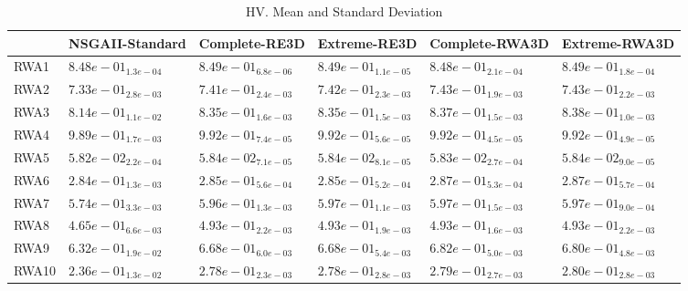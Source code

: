 \documentclass{article}
\begin{document}
\begin{table}
\caption{HV. Mean and Standard Deviation}
\label{table: HV}
\centering
\begin{scriptsize}
\begin{tabular}{llllll}
\hline & NSGAII-Standard & Complete-RE3D & Extreme-RE3D & Complete-RWA3D &  Extreme-RWA3D\\
\hline 
RWA1 & $  8.48e-01_{ 1.3e-04}$ & \cellcolor{gray95}$  8.49e-01_{ 6.8e-06}$ & \cellcolor{gray25}$  8.49e-01_{ 1.1e-05}$ & $  8.48e-01_{ 2.1e-04}$ & $  8.49e-01_{ 1.8e-04}$ \\
RWA2 & $  7.33e-01_{ 2.8e-03}$ & $  7.41e-01_{ 2.4e-03}$ & $  7.42e-01_{ 2.3e-03}$ & \cellcolor{gray95}$  7.43e-01_{ 1.9e-03}$ & \cellcolor{gray25}$  7.43e-01_{ 2.2e-03}$ \\
RWA3 & $  8.14e-01_{ 1.1e-02}$ & $  8.35e-01_{ 1.6e-03}$ & $  8.35e-01_{ 1.5e-03}$ & \cellcolor{gray25}$  8.37e-01_{ 1.5e-03}$ & \cellcolor{gray95}$  8.38e-01_{ 1.0e-03}$ \\
RWA4 & $  9.89e-01_{ 1.7e-03}$ & $  9.92e-01_{ 7.4e-05}$ & $  9.92e-01_{ 5.6e-05}$ & \cellcolor{gray25}$  9.92e-01_{ 4.5e-05}$ & \cellcolor{gray95}$  9.92e-01_{ 4.9e-05}$ \\
RWA5 & $  5.82e-02_{ 2.2e-04}$ & \cellcolor{gray25}$  5.84e-02_{ 7.1e-05}$ & $  5.84e-02_{ 8.1e-05}$ & $  5.83e-02_{ 2.7e-04}$ & \cellcolor{gray95}$  5.84e-02_{ 9.0e-05}$ \\
RWA6 & $  2.84e-01_{ 1.3e-03}$ & $  2.85e-01_{ 5.6e-04}$ & $  2.85e-01_{ 5.2e-04}$ & \cellcolor{gray95}$  2.87e-01_{ 5.3e-04}$ & \cellcolor{gray25}$  2.87e-01_{ 5.7e-04}$ \\
RWA7 & $  5.74e-01_{ 3.3e-03}$ & $  5.96e-01_{ 1.3e-03}$ & \cellcolor{gray95}$  5.97e-01_{ 1.1e-03}$ & \cellcolor{gray25}$  5.97e-01_{ 1.5e-03}$ & $  5.97e-01_{ 9.0e-04}$ \\
RWA8 & $  4.65e-01_{ 6.6e-03}$ & $  4.93e-01_{ 2.2e-03}$ & $  4.93e-01_{ 1.9e-03}$ & \cellcolor{gray95}$  4.93e-01_{ 1.6e-03}$ & \cellcolor{gray25}$  4.93e-01_{ 2.2e-03}$ \\
RWA9 & $  6.32e-01_{ 1.9e-02}$ & $  6.68e-01_{ 6.0e-03}$ & $  6.68e-01_{ 5.4e-03}$ & \cellcolor{gray95}$  6.82e-01_{ 5.0e-03}$ & \cellcolor{gray25}$  6.80e-01_{ 4.8e-03}$ \\
RWA10 & $  2.36e-01_{ 1.3e-02}$ & $  2.78e-01_{ 2.3e-03}$ & $  2.78e-01_{ 2.8e-03}$ & \cellcolor{gray25}$  2.79e-01_{ 2.7e-03}$ & \cellcolor{gray95}$  2.80e-01_{ 2.8e-03}$ \\
\hline
\end{tabular}
\end{scriptsize}
\end{table}
\end{document}
